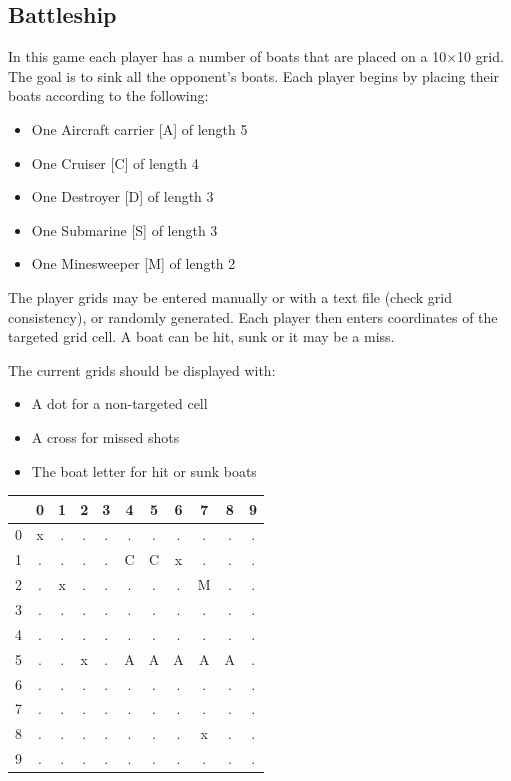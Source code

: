 \documentclass{ecnreport}
\begin{document}
\begin{itemize}
\end{itemize}

\subsection{Battleship}

In this game each player has a number of boats that are placed on a 10$\times$10 grid. The goal is to sink all the opponent's boats.
Each player begins by placing their boats according to the following:
\begin{itemize}
 \item One Aircraft carrier [A] of length 5
 \item One Cruiser [C] of length 4
 \item One Destroyer [D] of length 3
 \item One Submarine [S] of length 3
 \item One Minesweeper [M] of length 2
\end{itemize}

The player grids may be entered manually or with a text file (check grid consistency), or randomly generated.
Each player then enters coordinates of the targeted grid cell. A boat can be hit, sunk or it may be a miss. 

The current grids should be displayed with:
\begin{itemize}
 \item A dot for a non-targeted cell
 \item A cross for missed shots
 \item The boat letter for hit or sunk boats
\end{itemize}

\begin{center}
 \begin{tabular}{|c|c|c|c|c|c|c|c|c|c|c|}
 \hline 
 & 0 & 1 & 2& 3&4 &5 &6 & 7&  8&9 \\\hline
 0 &x&.&.&. &.& .&.&.&.&.\\\hline
 1 &.&.&.&. &C&C&x&.&.&.\\\hline
 2 &.&x&.&. &.&.&.&M&.&.\\\hline
 3 &.&.&.&. &.&.&.&.&.&.\\\hline
 4 &.&.&.&. &.&.&.&.&.&.\\\hline
 5 &.&.&x&. &A&A&A&A&A&.\\\hline
 6 &.&.&.&. &.&.&.&.&.&.\\\hline
 7 &.&.&.&. &.&.&.&.&.&.\\\hline
 8 &.&.&.&. &.&.&.&x&.&.\\\hline
 9 &.&.&.&. &.&.&.&.&.&.\\\hline
 \end{tabular}
\end{center}
\begin{itemize}
\end{itemize}
\end{document}
